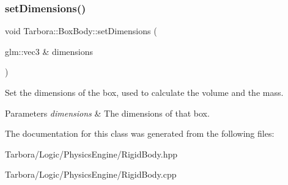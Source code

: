 \subsubsection{\texorpdfstring{set\+Dimensions()}{setDimensions()}}
{\footnotesize\ttfamily void Tarbora\+::\+Box\+Body\+::set\+Dimensions (\begin{DoxyParamCaption}\item[{glm\+::vec3 \&}]{dimensions }\end{DoxyParamCaption})\hspace{0.3cm}{\ttfamily [inline]}}



Set the dimensions of the box, used to calculate the volume and the mass. 


\begin{DoxyParams}{Parameters}
{\em dimensions} & The dimensions of that box. \\
\hline
\end{DoxyParams}


The documentation for this class was generated from the following files\+:\begin{DoxyCompactItemize}
\item 
Tarbora/\+Logic/\+Physics\+Engine/Rigid\+Body.\+hpp\item 
Tarbora/\+Logic/\+Physics\+Engine/Rigid\+Body.\+cpp\end{DoxyCompactItemize}
